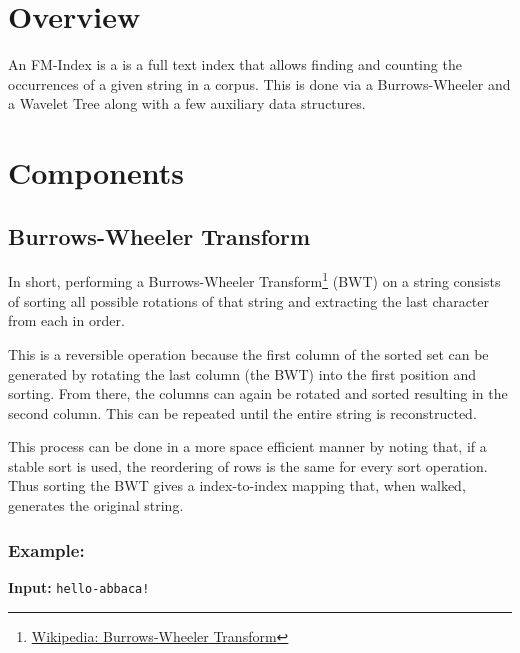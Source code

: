 \documentclass[12pt]{article}
\begin{document}
\maketitle


\tableofcontents


\section{Overview}

An FM-Index is a is a full text index that allows finding and counting the
 occurrences of a given string in a corpus.
This is done via a Burrows-Wheeler and a Wavelet Tree along with a few auxiliary
 data structures.

\section{Components}

\subsection{Burrows-Wheeler Transform}

In short, performing a Burrows-Wheeler Transform\footnote{\href{https://en.wikipedia.org/wiki/Burrows-Wheeler_transform}{Wikipedia: Burrows-Wheeler Transform}}
(BWT) on a string consists of sorting all possible rotations of that string and
 extracting the last character from each in order.

This is a reversible operation because the first column of the sorted set can be
 generated by rotating the last column (the BWT) into the first position and sorting.
From there, the columns can again be rotated and sorted resulting in the second
 column.
This can be repeated until the entire string is reconstructed.

This process can be done in a more space efficient manner by noting that, if a
 stable sort is used, the reordering of rows is the same for every sort operation.
Thus sorting the BWT gives a index-to-index mapping that, when walked, generates
 the original string.

\subsubsection{Example:}
\textbf{Input:} {\tt hello-abbaca!}
\end{document}
